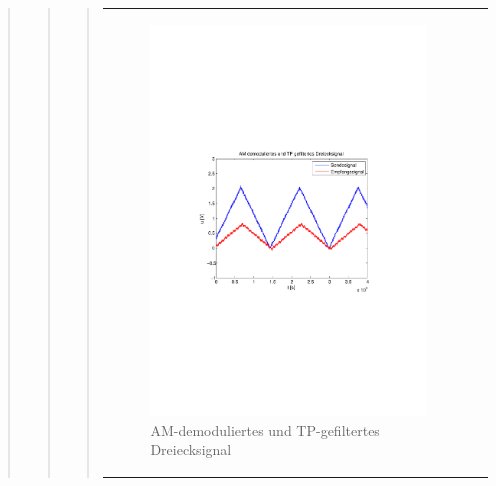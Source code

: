 \begin{quote}
\begin{quote}
\begin{quote}
\begin{center}
\begin{tabular}{ll}
\begin{minipage}{0.6\textwidth}
                         \begin{figure}[H]
                            \label{fig:}
                            \includegraphics[scale=0.5, trim = 3cm 9cm 3.5cm
                            9.5cm, clip]{./Bilder/synchDemodFilter_dreieck} %
                            \caption{AM-demoduliertes und
                            TP-gefiltertes Dreiecksignal}
                        \end{figure}
                   \vspace{-1.5em}
    
                    \end{minipage}
    
                \end{tabular}
                \end{center}
                

\end{quote}
\end{quote}
\end{quote}
